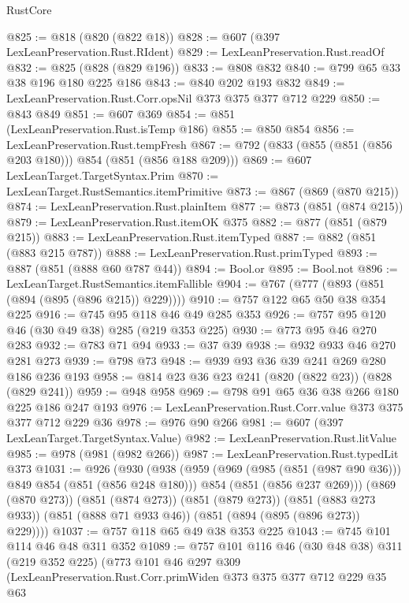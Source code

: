 \begin{lexlean}{RustCore}
\begin{coremodule}
{\begin{coremodule}
{{{{{@825 := @818 (@820 (@822 @18))
@828 := @607 (@397 LexLeanPreservation.Rust.RIdent)
@829 := LexLeanPreservation.Rust.readOf
@832 := @825 (@828 (@829 @196))
@833 := @808 @832
@840 := @799 @65 @33 @38 @196 @180 @225 @186
@843 := @840 @202 @193 @832
@849 := LexLeanPreservation.Rust.Corr.opsNil @373 @375 @377 @712 @229
@850 := @843 @849
@851 := @607 @369
@854 := @851 (LexLeanPreservation.Rust.isTemp @186)
@855 := @850 @854
@856 := LexLeanPreservation.Rust.tempFresh
@867 := @792 (@833 (@855 (@851 (@856 @203 @180))) @854 (@851 (@856 @188 @209)))
@869 := @607 LexLeanTarget.TargetSyntax.Prim
@870 := LexLeanTarget.RustSemantics.itemPrimitive
@873 := @867 (@869 (@870 @215))
@874 := LexLeanPreservation.Rust.plainItem
@877 := @873 (@851 (@874 @215))
@879 := LexLeanPreservation.Rust.itemOK @375
@882 := @877 (@851 (@879 @215))
@883 := LexLeanPreservation.Rust.itemTyped
@887 := @882 (@851 (@883 @215 @787))
@888 := LexLeanPreservation.Rust.primTyped
@893 := @887 (@851 (@888 @60 @787 @44))
@894 := Bool.or
@895 := Bool.not
@896 := LexLeanTarget.RustSemantics.itemFallible
@904 := @767 (@777 (@893 (@851 (@894 (@895 (@896 @215)) @229))))
@910 := @757 @122 @65 @50 @38 @354 @225
@916 := @745 @95 @118 @46 @49 @285 @353
@926 := @757 @95 @120 @46 (@30 @49 @38) @285 (@219 @353 @225)
@930 := @773 @95 @46 @270 @283
@932 := @783 @71 @94
@933 := @37 @39
@938 := @932 @933 @46 @270 @281 @273
@939 := @798 @73
@948 := @939 @93 @36 @39 @241 @269 @280 @186 @236 @193
@958 := @814 @23 @36 @23 @241 (@820 (@822 @23)) (@828 (@829 @241))
@959 := @948 @958
@969 := @798 @91 @65 @36 @38 @266 @180 @225 @186 @247 @193
@976 := LexLeanPreservation.Rust.Corr.value @373 @375 @377 @712 @229 @36
@978 := @976 @90 @266
@981 := @607 (@397 LexLeanTarget.TargetSyntax.Value)
@982 := LexLeanPreservation.Rust.litValue
@985 := @978 (@981 (@982 @266))
@987 := LexLeanPreservation.Rust.typedLit @373
@1031 := @926
    (@930
      (@938
        (@959
          (@969 (@985 (@851 (@987 @90 @36))) @849 @854 (@851 (@856 @248 @180)))
          @854
          (@851 (@856 @237 @269)))
        (@869 (@870 @273))
        (@851 (@874 @273))
        (@851 (@879 @273))
        (@851 (@883 @273 @933))
        (@851 (@888 @71 @933 @46))
        (@851 (@894 (@895 (@896 @273)) @229))))
@1037 := @757 @118 @65 @49 @38 @353 @225
@1043 := @745 @101 @114 @46 @48 @311 @352
@1089 := @757
    @101
    @116
    @46
    (@30 @48 @38)
    @311
    (@219 @352 @225)
    (@773
      @101
      @46
      @297
      @309
      (LexLeanPreservation.Rust.Corr.primWiden
        @373
        @375
        @377
        @712
        @229
        @35
        @63
}}}}}
\end{coremodule}}
\end{coremodule}
\end{lexlean}
